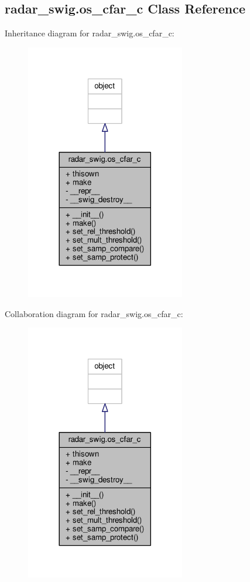 \subsection{radar\+\_\+swig.\+os\+\_\+cfar\+\_\+c Class Reference}
\label{classradar__swig_1_1os__cfar__c}


Inheritance diagram for radar\+\_\+swig.\+os\+\_\+cfar\+\_\+c\+:
\nopagebreak
\begin{figure}[H]
\begin{center}
\leavevmode
\includegraphics[width=197pt]{d4/d11/classradar__swig_1_1os__cfar__c__inherit__graph}
\end{center}
\end{figure}


Collaboration diagram for radar\+\_\+swig.\+os\+\_\+cfar\+\_\+c\+:
\nopagebreak
\begin{figure}[H]
\begin{center}
\leavevmode
\includegraphics[width=197pt]{dc/dc1/classradar__swig_1_1os__cfar__c__coll__graph}
\end{center}
\end{figure}
